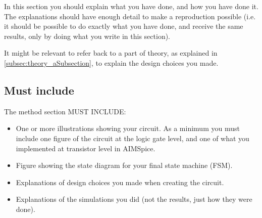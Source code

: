 


In this section you should explain what you have done, and how you have done it. The explanations should have enough detail to make a reproduction possible (i.e. it should be possible to do exactly what you have done, and receive the same results, only by doing what you write in this section).


It might be relevant to refer back to a part of theory, as explained in \autoref{subsec:theory_aSubsection}, to explain the design choices you made.

\subsection{Must include}
The method section MUST INCLUDE:
\begin{itemize}
    \item One or more illustrations showing your circuit. As a minimum you must include one figure of the circuit at the logic gate level, and one of what you implemented at transistor level in AIMSpice.
    \item Figure showing the state diagram for your final state machine (FSM).
    \item Explanations of design choices you made when creating the circuit.
    \item Explanations of the simulations you did (not the results, just how they were done).
\end{itemize}